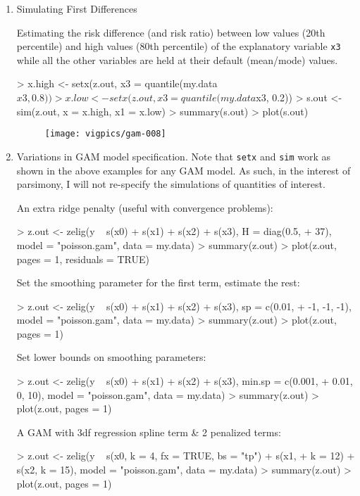 \begin{enumerate}
\item Simulating First Differences

Estimating the risk difference (and risk ratio) between low values (20th percentile) and high values (80th percentile) of the explanatory variable {\tt x3} while all the other variables are held at their default (mean/mode) values. 

\begin{Schunk}
\begin{Sinput}
> x.high <- setx(z.out, x3 = quantile(my.data$x3, 0.8))
> x.low <- setx(z.out, x3 = quantile(my.data$x3, 0.2))
> s.out <- sim(z.out, x = x.high, x1 = x.low)
> summary(s.out)
> plot(s.out)
\end{Sinput}
\end{Schunk}
\begin{figure}[here]
\centering
\texttt{[image: vigpics/gam-008]}
\label{fig:plotgam}
\end{figure}

\item Variations in GAM model specification. Note that {\tt setx} and {\tt sim} work as shown in the above examples for any GAM model. As such, in the interest of parsimony, I will not re-specify the simulations of quantities of interest. 

An extra ridge penalty (useful with convergence problems):
\begin{Schunk}
\begin{Sinput}
> z.out <- zelig(y ~ s(x0) + s(x1) + s(x2) + s(x3), H = diag(0.5, 
+     37), model = "poisson.gam", data = my.data)
> summary(z.out)
> plot(z.out, pages = 1, residuals = TRUE)
\end{Sinput}
\end{Schunk}
Set the smoothing parameter for the first term, estimate the rest:
\begin{Schunk}
\begin{Sinput}
> z.out <- zelig(y ~ s(x0) + s(x1) + s(x2) + s(x3), sp = c(0.01, 
+     -1, -1, -1), model = "poisson.gam", data = my.data)
> summary(z.out)
> plot(z.out, pages = 1)
\end{Sinput}
\end{Schunk}
Set lower bounds on smoothing parameters:
\begin{Schunk}
\begin{Sinput}
> z.out <- zelig(y ~ s(x0) + s(x1) + s(x2) + s(x3), min.sp = c(0.001, 
+     0.01, 0, 10), model = "poisson.gam", data = my.data)
> summary(z.out)
> plot(z.out, pages = 1)
\end{Sinput}
\end{Schunk}
A GAM with 3df regression spline term \& 2 penalized terms:
\begin{Schunk}
\begin{Sinput}
> z.out <- zelig(y ~ s(x0, k = 4, fx = TRUE, bs = "tp") + s(x1, 
+     k = 12) + s(x2, k = 15), model = "poisson.gam", data = my.data)
> summary(z.out)
> plot(z.out, pages = 1)
\end{Sinput}
\end{Schunk}
\end{enumerate}



